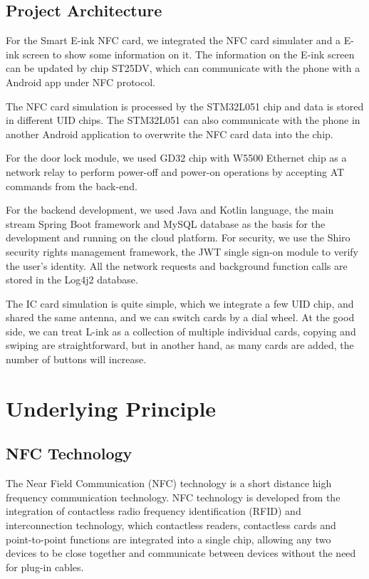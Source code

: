 \documentclass[11pt, a4paper]{article}
\begin{document}
\subsection{Project Architecture}

For the Smart E-ink NFC card, we integrated the NFC card simulater and a E-ink screen to show some information on it. The information on the E-ink screen can be updated by chip ST25DV, which can communicate with the phone with a Android app under NFC protocol.

The NFC card simulation is processed by the STM32L051 chip and data is stored in different UID chips. The STM32L051 can also communicate with the phone in another Android application to overwrite the NFC card data into the chip.

For the door lock module, we used GD32 chip with W5500 Ethernet chip as a network relay to perform power-off and power-on operations by accepting AT commands from the back-end.

For the backend development, we used Java and Kotlin language, the main stream Spring Boot framework and MySQL database as the basis for the development and running on the cloud platform.
For security, we use the Shiro security rights management framework, the JWT single sign-on module to verify the user's identity.
All the network requests and background function calls are stored in the Log4j2 database.

The IC card simulation is quite simple, which we integrate a few UID chip, and shared the same antenna, and we can switch cards by a dial wheel. At the good side, we can treat L-ink as a collection of multiple individual cards, copying and swiping are straightforward, but in another hand, as many cards are added, the number of buttons will increase.


\section{Underlying Principle}

\subsection{NFC Technology}
The Near Field Communication (NFC) technology is a short distance high frequency communication technology. NFC technology is developed from the integration of contactless radio frequency identification (RFID) and interconnection technology, which contactless readers, contactless cards and point-to-point functions are integrated into a single chip, allowing any two devices to be close together and communicate between devices without the need for plug-in cables.
\end{document}
